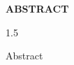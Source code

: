 \begin{center}\vspace{1.5in}
\bfseries\LARGE{ABSTRACT} \\
\end{center}\vspace{0.2in}

\normalsize{\begin{spacing}{1.5}
\noindent



Abstract




\end{spacing}}
	
